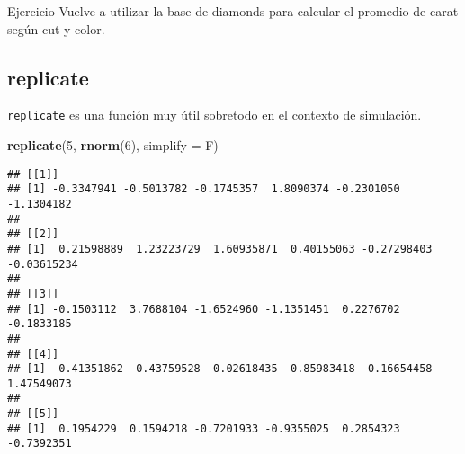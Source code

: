 \documentclass[]{article}
\newenvironment{Shaded}{\begin{snugshade}}{\end{snugshade}}
\newcommand{\KeywordTok}[1]{\textcolor[rgb]{0.13,0.29,0.53}{\textbf{#1}}}
\newcommand{\DataTypeTok}[1]{\textcolor[rgb]{0.13,0.29,0.53}{#1}}
\newcommand{\DecValTok}[1]{\textcolor[rgb]{0.00,0.00,0.81}{#1}}
\newcommand{\StringTok}[1]{\textcolor[rgb]{0.31,0.60,0.02}{#1}}
\newcommand{\CommentTok}[1]{\textcolor[rgb]{0.56,0.35,0.01}{\textit{#1}}}
\newcommand{\OperatorTok}[1]{\textcolor[rgb]{0.81,0.36,0.00}{\textbf{#1}}}
\newcommand{\NormalTok}[1]{#1}
\begin{document}
\renewcommand\bcStyleTitre[1]{\large\textcolor{bbblack}{#1}}

\begin{bclogo}[
  couleur=llred,
  arrondi=0,
  logo=\bcstop,
  barre=none,
  noborder=true]{Ejercicio}
Vuelve a utilizar la base de diamonds para calcular el promedio 
de carat según cut y color.
\end{bclogo}

\begin{Shaded}
\end{Shaded}

\subsection{replicate}\label{replicate}

\texttt{replicate} es una función muy útil sobretodo en el contexto de
simulación.

\begin{Shaded}
\begin{Highlighting}[]
\KeywordTok{replicate}\NormalTok{(}\DecValTok{5}\NormalTok{, }\KeywordTok{rnorm}\NormalTok{(}\DecValTok{6}\NormalTok{), }\DataTypeTok{simplify =}\NormalTok{ F)}
\end{Highlighting}
\end{Shaded}

\begin{verbatim}
## [[1]]
## [1] -0.3347941 -0.5013782 -0.1745357  1.8090374 -0.2301050 -1.1304182
## 
## [[2]]
## [1]  0.21598889  1.23223729  1.60935871  0.40155063 -0.27298403 -0.03615234
## 
## [[3]]
## [1] -0.1503112  3.7688104 -1.6524960 -1.1351451  0.2276702 -0.1833185
## 
## [[4]]
## [1] -0.41351862 -0.43759528 -0.02618435 -0.85983418  0.16654458  1.47549073
## 
## [[5]]
## [1]  0.1954229  0.1594218 -0.7201933 -0.9355025  0.2854323 -0.7392351
\end{verbatim}
\end{document}
